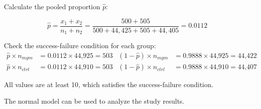 \begin{example}
Calculate the pooled proportion $\hat{p}$: 

\[\hat{p} = \dfrac{x_{1} + x_{2}}{n_{1} + n_{2}} = \dfrac{500 + 505}{500 + 44,425 + 505 + 44,405} = 0.0112 \]

Check the success-failure condition for each group: 
\begin{align*}
\hat{p} \times n_{mgm} &= 0.0112 \times \text{44,925} = 503
& (1 - \hat{p}) \times n_{mgm} &= 0.9888 \times \text{44,925} = \text{44,422} \\
\hat{p} \times n_{ctrl} &= 0.0112 \times \text{44,910} = 503
& (1 - \hat{p}) \times n_{ctrl} &= 0.9888 \times \text{44,910} = \text{44,407}
\end{align*}

All values are at least 10, which satisfies the success-failure condition. 

The normal model can be used to analyze the study results.
\label{mammogramSuccessFailure}
\end{example}

